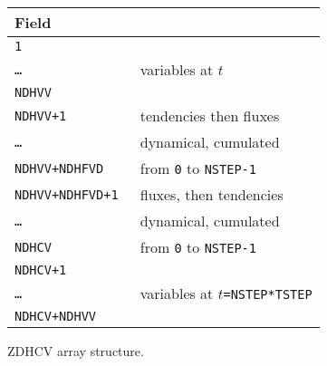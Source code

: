 \begin{center}

\begin{tabular}{|l|l|}
\hline
Field & \\
\hline \hline
\tt 1 & \\ \cline{1-1}
\tt \ldots & variables at $t$ \\ \cline{1-1}
\tt NDHVV & \\ \hline
\tt NDHVV+1 & tendencies then fluxes \\ \cline{1-1}
\tt \ldots & dynamical, cumulated \\ \cline{1-1}
\tt NDHVV+NDHFVD & from {\tt 0} to {\tt NSTEP-1} \\ \hline
\tt NDHVV+NDHFVD+1 & fluxes, then tendencies \\ \cline{1-1}
\tt \ldots & dynamical, cumulated  \\ \cline{1-1}
\tt NDHCV & from {\tt 0} to {\tt NSTEP-1} \\ \hline
\tt NDHCV+1 & \\ \cline{1-1}
\tt \ldots & variables at $t${\tt =NSTEP*TSTEP} \\ \cline{1-1}
\tt NDHCV+NDHVV & \\ \hline
\end{tabular}

\ms
ZDHCV array structure.
\end{center}

